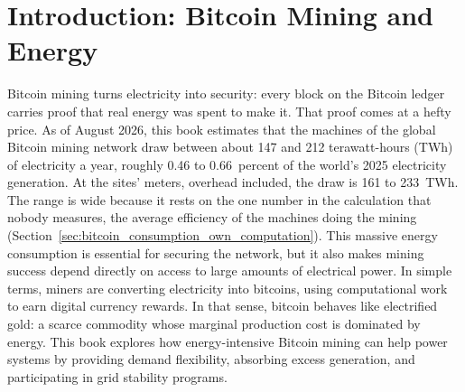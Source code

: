\chapter{Introduction: Bitcoin Mining and Energy}

Bitcoin mining turns electricity into security: every block on the Bitcoin ledger carries proof that real energy was spent to make it. That proof comes at a hefty price. As of August 2026, this book estimates that the machines of the global Bitcoin mining network draw between about 147 and 212 terawatt-hours (TWh) of electricity a year, roughly 0.46 to 0.66~percent of the world's 2025 electricity generation. At the sites' meters, overhead included, the draw is 161 to 233~TWh. The range is wide because it rests on the one number in the calculation that nobody measures, the average efficiency of the machines doing the mining (Section~\ref{sec:bitcoin_consumption_own_computation}). %
This massive energy consumption is essential for securing the network, but it also makes mining success depend directly on access to large amounts of electrical power. In simple terms, miners are converting electricity into bitcoins, using computational work to earn digital currency rewards. In that sense, bitcoin behaves like electrified gold: a scarce commodity whose marginal production cost is dominated by energy. This book explores how energy-intensive Bitcoin mining can help power systems by providing demand flexibility, absorbing excess generation, and participating in grid stability programs.

